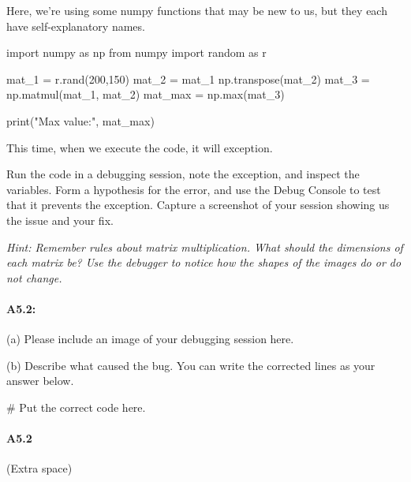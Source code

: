 \documentclass[11pt]{article}
\begin{document}
Here, we're using some numpy functions that may be new to us, but they each have self-explanatory names.

\begin{python}
import numpy as np
from numpy import random as r

mat_1 = r.rand(200,150)
mat_2 = mat_1
np.transpose(mat_2)
mat_3 = np.matmul(mat_1, mat_2)
mat_max = np.max(mat_3)

print("Max value:", mat_max)
\end{python}

This time, when we execute the code, it will exception.

Run the code in a debugging session, note the exception, and inspect the variables. Form a hypothesis for the error, and use the Debug Console to test that it prevents the exception. Capture a screenshot of your session showing us the issue and your fix.

\emph{Hint: Remember rules about matrix multiplication. What should the dimensions of each matrix be? Use the debugger to notice how the shapes of the images do or do not change.}

\paragraph{A5.2:} 

(a) Please include an image of your debugging session here.


(b) Describe what caused the bug. You can write the corrected lines as your answer below.
\begin{python}
# Put the correct code here.
\end{python}


\pagebreak
\paragraph{A5.2} (Extra space)
\end{document}
